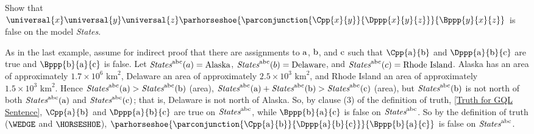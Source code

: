 \begin{majorILnc}{}
	Show that $\universal{\variable{x}}\universal{\variable{y}}\universal{\variable{z}}\parhorseshoe{\parconjunction{\Cpp{\variable{x}}{\variable{y}}}{\Dppp{\variable{x}}{\variable{y}}{\variable{z}}}}{\Bppp{\variable{y}}{\variable{x}}{\variable{z}}}$ is false on the model \emph{States}. 
\end{majorILnc}
\begin{PROOF}
	As in the last example, assume for indirect proof that there are assignments to $\mathrm{a}$, $\mathrm{b}$, and $\mathrm{c}$ such that $\Cpp{\constant{a}}{\constant{b}}$ and $\Dppp{\constant{a}}{\constant{b}}{\constant{c}}$ are true and $\Bppp{\constant{b}}{\constant{a}}{\constant{c}}$ is false.
	Let $\emph{States}^{\mathrm{a}\mathrm{b}\mathrm{c}}(a)=\text{Alaska}$, $\emph{States}^{\mathrm{a}\mathrm{b}\mathrm{c}}(b)=\text{Delaware}$, and $\emph{States}^{\mathrm{a}\mathrm{b}\mathrm{c}}(c)=\text{Rhode Island}$.
	Alaska has an area of approximately $1.7\times{}10^6\text{ km}^2$, Delaware an area of approximately $2.5\times{}10^3\text{ km}^2$, and Rhode Island an area of approximately $1.5\times{}10^3\text{ km}^2$.
	Hence $\emph{States}^{\mathrm{a}\mathrm{b}\mathrm{c}}(\mathrm{a})>\emph{States}^{\mathrm{a}\mathrm{b}\mathrm{c}}(\mathrm{b})$ (area), $\emph{States}^{\mathrm{a}\mathrm{b}\mathrm{c}}(\mathrm{a})+\emph{States}^{\mathrm{a}\mathrm{b}\mathrm{c}}(\mathrm{b})>\emph{States}^{\mathrm{a}\mathrm{b}\mathrm{c}}(\mathrm{c})$ (area), but $\emph{States}^{\mathrm{a}\mathrm{b}\mathrm{c}}(\mathrm{b})$ is not north of both $\emph{States}^{\mathrm{a}\mathrm{b}\mathrm{c}}(\mathrm{a})$ and $\emph{States}^{\mathrm{a}\mathrm{b}\mathrm{c}}(\mathrm{c})$; that is, Delaware is not north of Alaska. 
	So, by clause (3) of the definition of truth, \ref{Truth for GQL Sentence}, $\Cpp{\constant{a}}{\constant{b}}$ and $\Dppp{\constant{a}}{\constant{b}}{\constant{c}}$ are true on $\emph{States}^{\mathrm{a}\mathrm{b}\mathrm{c}}$, while $\Bppp{\constant{b}}{\constant{a}}{\constant{c}}$ is false on $\emph{States}^{\mathrm{a}\mathrm{b}\mathrm{c}}$. 
	So by the definition of truth ($\WEDGE$ and $\HORSESHOE$), $\parhorseshoe{\parconjunction{\Cpp{\constant{a}}{\constant{b}}}{\Dppp{\constant{a}}{\constant{b}}{\constant{c}}}}{\Bppp{\constant{b}}{\constant{a}}{\constant{c}}}$ is false on $\emph{States}^{\mathrm{a}\mathrm{b}\mathrm{c}}$. 
	

\end{PROOF}
